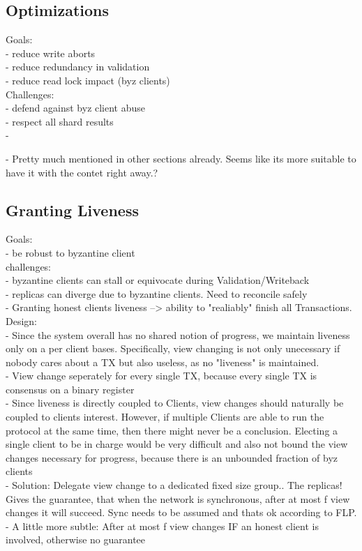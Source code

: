 \subsection{Optimizations}
Goals:\\
- reduce write aborts\\
- reduce redundancy in validation\\
- reduce read lock impact (byz clients)\\

Challenges:\\
- defend against byz client abuse\\
- respect all shard results\\
- 

- Pretty much mentioned in other sections already. Seems like its more suitable to have it with the contet right away.?

\subsection{Granting Liveness}
Goals:\\
- be robust to byzantine client\\


challenges:\\
- byzantine clients can stall or equivocate during Validation/Writeback\\
- replicas can diverge due to byzantine clients. Need to reconcile safely\\
- Granting honest clients liveness --> ability to "realiably" finish all Transactions.\\


Design: \\
- Since the system overall has no shared notion of progress, we maintain liveness only on a per client bases. Specifically, view changing is not only unecessary if nobody cares about a TX but also useless, as no "liveness" is maintained.\\
- View change seperately for every single TX, because every single TX is consensus on a binary register\\
- Since liveness is directly coupled to Clients, view changes should naturally be coupled to clients interest. However, if multiple Clients are able to run the protocol at the same time, then there might never be a conclusion. Electing a single client to be in charge would be very difficult and also not bound the view changes necessary for progress, because there is an unbounded fraction of byz clients\\
- Solution: Delegate view change to a dedicated fixed size group.. The replicas! Gives the guarantee, that when the network is synchronous, after at most f view changes it will succeed. Sync needs to be assumed and thats ok according to FLP.\\
- A little more subtle: After at most f view changes IF an honest client is involved, otherwise no guarantee\\

